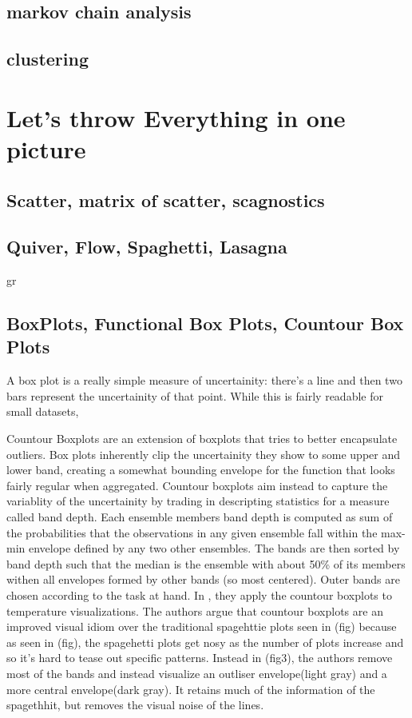\documentclass[letterpaper,onecolumn,titlepage]{Ythesis}
\begin{document}
\subsection{markov chain analysis}
\subsection{clustering}

\section{Let's throw Everything in one picture}                                                        
\subsection{Scatter, matrix of scatter, scagnostics}                                        
\subsection{Quiver, Flow, Spaghetti, Lasagna}

gr


\subsection{BoxPlots, Functional Box Plots, Countour Box Plots}                                      
A box plot is a really simple measure of uncertainity: there's a line and then two bars represent the uncertainity of that point. %
While this is fairly readable for small datasets, %




Countour Boxplots \cite{Whitaker2013} are an extension of boxplots that tries to better encapsulate outliers. Box plots inherently clip the uncertainity they show to some upper and lower band, 
creating a somewhat bounding envelope for the function that looks fairly regular when aggregated. Countour boxplots aim instead to capture the variablity of the uncertainity by trading in descripting
statistics for a measure called band depth. Each ensemble members band depth is computed as sum of the probabilities that the observations in any given ensemble fall within the max-min envelope defined by any two other ensembles. The bands are then sorted by band depth such that the median is the ensemble with about 50\% of its members withen all envelopes formed by other bands (so most centered). Outer bands are chosen according to the task at hand. In \cite{Whitaker2013}, they apply the countour boxplots to temperature visualizations. %
The authors argue that countour boxplots are an improved visual idiom over the traditional spagehttie plots seen in (fig) because as seen in (fig), the spagehetti plots get nosy as the number of plots increase and so it's hard to tease out specific patterns. Instead in (fig3), the authors remove most of the bands and instead visualize an outliser envelope(light gray) and a more central envelope(dark gray). It retains much of the information of the spagethhit, but removes the visual noise of the lines.  
\end{document}
